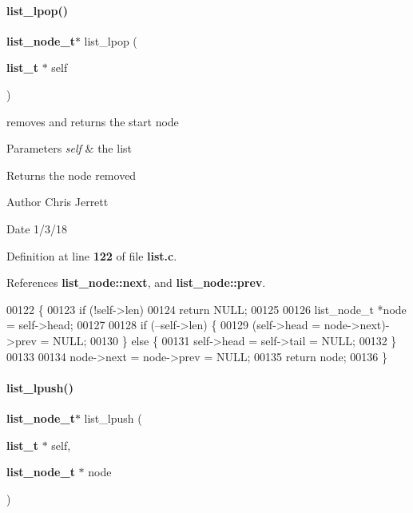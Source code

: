 \paragraph{list\+\_\+lpop()}
{\footnotesize\ttfamily \textbf{ list\+\_\+node\+\_\+t}$\ast$ list\+\_\+lpop (\begin{DoxyParamCaption}\item[{\textbf{ list\+\_\+t} $\ast$}]{self }\end{DoxyParamCaption})}



removes and returns the start node 


\begin{DoxyParams}{Parameters}
{\em self} & the list \\
\hline
\end{DoxyParams}
\begin{DoxyReturn}{Returns}
the node removed 
\end{DoxyReturn}
\begin{DoxyAuthor}{Author}
Chris Jerrett 
\end{DoxyAuthor}
\begin{DoxyDate}{Date}
1/3/18 
\end{DoxyDate}


Definition at line \textbf{ 122} of file \textbf{ list.\+c}.



References \textbf{ list\+\_\+node\+::next}, and \textbf{ list\+\_\+node\+::prev}.


\begin{DoxyCode}
00122                                      \{
00123   \textcolor{keywordflow}{if} (!self->len)
00124     \textcolor{keywordflow}{return} NULL;
00125 
00126   list_node_t *node = \textcolor{keyword}{self}->head;
00127 
00128   \textcolor{keywordflow}{if} (--self->len) \{
00129     (\textcolor{keyword}{self}->head = node->next)->prev = NULL;
00130   \} \textcolor{keywordflow}{else} \{
00131     \textcolor{keyword}{self}->head = \textcolor{keyword}{self}->tail = NULL;
00132   \}
00133 
00134   node->next = node->prev = NULL;
00135   \textcolor{keywordflow}{return} node;
00136 \}
\end{DoxyCode}
\mbox{\label{list_8c_a7e1b077416813dd474a54826347f7502}} 
\paragraph{list\+\_\+lpush()}
{\footnotesize\ttfamily \textbf{ list\+\_\+node\+\_\+t}$\ast$ list\+\_\+lpush (\begin{DoxyParamCaption}\item[{\textbf{ list\+\_\+t} $\ast$}]{self,  }\item[{\textbf{ list\+\_\+node\+\_\+t} $\ast$}]{node }\end{DoxyParamCaption})}



